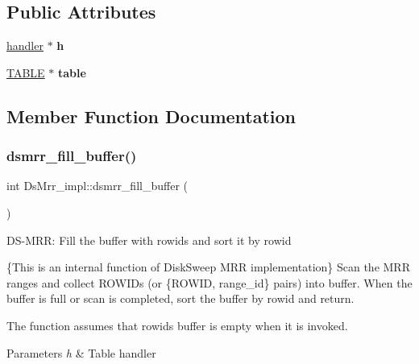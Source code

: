 \subsection*{Public Attributes}
\begin{DoxyCompactItemize}
\item 
\mbox{\label{classDsMrr__impl_ab9e54b21d0894065fe5964c1f9cc88ab}} 
\mbox{\hyperlink{classhandler}{handler}} $\ast$ {\bfseries h}
\item 
\mbox{\label{classDsMrr__impl_aed8fc84364868b01cb0d19537d5fa5b3}} 
\mbox{\hyperlink{structTABLE}{T\+A\+B\+LE}} $\ast$ {\bfseries table}
\end{DoxyCompactItemize}


\subsection{Member Function Documentation}
\mbox{\label{classDsMrr__impl_a444c0116a9c9b9eefb73195e8ad5c3e6}} 
\subsubsection{\texorpdfstring{dsmrr\+\_\+fill\+\_\+buffer()}{dsmrr\_fill\_buffer()}}
{\footnotesize\ttfamily int Ds\+Mrr\+\_\+impl\+::dsmrr\+\_\+fill\+\_\+buffer (\begin{DoxyParamCaption}{ }\end{DoxyParamCaption})}

DS-\/M\+RR\+: Fill the buffer with rowids and sort it by rowid

\{This is an internal function of Disk\+Sweep M\+RR implementation\} Scan the M\+RR ranges and collect R\+O\+W\+I\+Ds (or \{R\+O\+W\+ID, range\+\_\+id\} pairs) into buffer. When the buffer is full or scan is completed, sort the buffer by rowid and return.

The function assumes that rowids buffer is empty when it is invoked.


\begin{DoxyParams}{Parameters}
{\em h} & Table handler\\
\hline
\end{DoxyParams}

